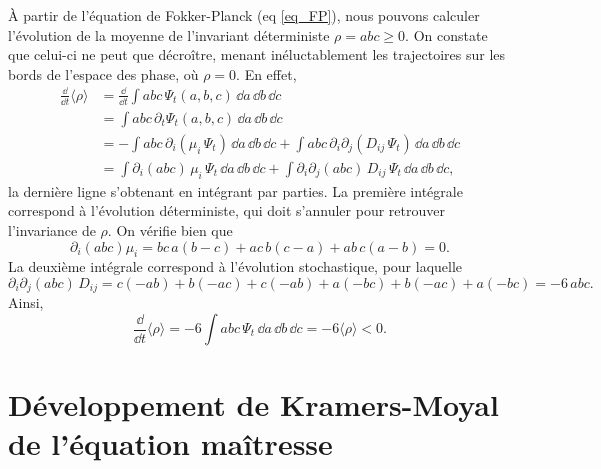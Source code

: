 \documentclass[openany,a4paper,12pt]{article}
\begin{document}
\par À partir de l'équation de Fokker-Planck (eq \ref{eq_FP}), nous pouvons calculer l'évolution de la moyenne de l'invariant déterministe $\rho=abc\geq 0$. On constate que celui-ci ne peut que décroître, menant inéluctablement les trajectoires sur les bords de l'espace des phase, où $\rho=0$. En effet,
%
\begin{equation}\label{dt_rho_initial}
\begin{split}
	\frac{\dd}{\dd t} \langle \rho \rangle 
	&= \frac{\dd}{\dd t} \int abc \, \Psi_t(a,b,c) \, \dd a \, \dd b \, \dd c \\
	&= \int abc \, \partial_t \Psi_t(a,b,c) \, \dd a \, \dd b \, \dd c \\
	&= - \int abc \, \partial_i (\mu_i \, \Psi_t) \, \dd a \, \dd b \, \dd c 
	+ \int abc \, \partial_i\partial_j (D_{ij} \, \Psi_t) \, \dd a \, \dd b \, \dd c \\
	&= \int \partial_i (abc) \, \mu_i \, \Psi_t \, \dd a \, \dd b \, \dd c
	+ \int \partial_i\partial_j (abc) \, D_{ij} \, \Psi_t \, \dd a \, \dd b \, \dd c,
\end{split}
\end{equation}
%
la dernière ligne s'obtenant en intégrant par parties. La première intégrale correspond à l'évolution déterministe, qui doit s'annuler pour retrouver l'invariance de $\rho$. On vérifie bien que 
%
\begin{equation}\label{dt_rho_contrib_det}
	\partial_i(abc) \mu_i = bc\, a(b-c) + ac\, b(c-a) + ab\, c(a-b) = 0.
\end{equation}
%
La deuxième intégrale correspond à l'évolution stochastique, pour laquelle
%
\begin{equation}\label{dt_rho_contrib_stoch}
	\partial_i\partial_j (abc) \, D_{ij} = c(-ab)+b(-ac)+c(-ab)+a(-bc)+b(-ac)+a(-bc) = -6\, abc.
\end{equation}
Ainsi,
%
\begin{equation}\label{dt_rho_final}
	\frac{\dd}{\dd t} \langle \rho \rangle = -6 \int abc \, \Psi_t \, \dd a \, \dd b \, \dd c = -6 \langle \rho \rangle < 0.
\end{equation}
%

\section{Développement de Kramers-Moyal de l'équation maîtresse}
\label{section_kramers_moyal}
\end{document}
